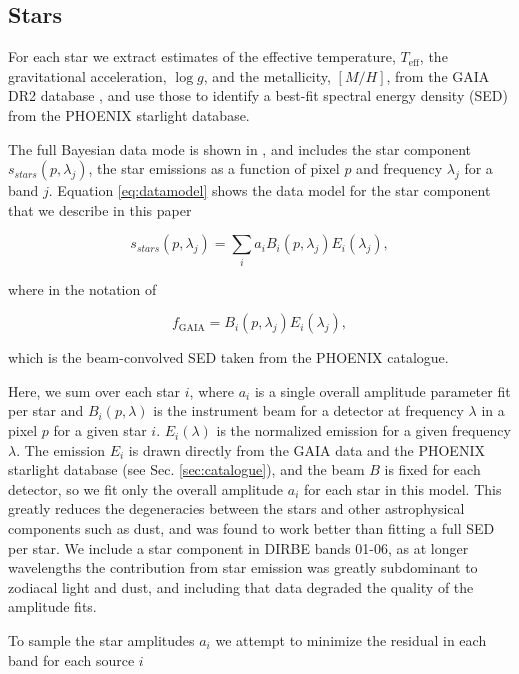 \documentclass{aa}
\begin{document}
\subsection{Stars}

\label{sec:starmodel}

For each star we extract estimates of the effective temperature, $T_{\mathrm{eff}}$, the gravitational acceleration, $\log g$, and the metallicity, $[M/H]$, from the GAIA DR2 database \cite{gaiaCat}, and use those to identify a best-fit spectral energy density (SED) from the PHOENIX starlight database. 

The full Bayesian data mode is shown in \cite{CG02_01}, and includes the star component $s_{stars}(p, \lambda_j)$, the star emissions as a function of pixel $p$ and frequency $\lambda_j$ for a band $j$. Equation \ref{eq:datamodel} shows the data model for the star component that we describe in this paper


\begin{equation}
s_{stars}(p, \lambda_j) = \sum_i a_i B_i(p, \lambda_j) E_i(\lambda_j),
\label{eq:datamodel}
\end{equation}

where in the notation of \cite{CG02_01} 

\begin{equation}
f_{\mathrm{GAIA}} = B_i(p, \lambda_j) E_i(\lambda_j),
\end{equation}

which is the beam-convolved SED taken from the PHOENIX catalogue.

Here, we sum over each star $i$, where $a_i$ is a single overall amplitude parameter fit per star and $B_i(p, \lambda)$ is the instrument beam for a detector at frequency $\lambda$ in a pixel $p$ for a given star $i$. $E_i(\lambda)$ is the normalized emission for a given frequency $\lambda$. The emission $E_i$ is drawn directly from the GAIA data and the PHOENIX starlight database (see Sec. \ref{sec:catalogue}), and the beam $B$ is fixed for each detector, so we fit only the overall amplitude $a_i$ for each star in this model. This greatly reduces the degeneracies between the stars and other astrophysical components such as dust, and was found to work better than fitting a full SED per star. We include a star component in DIRBE bands 01-06, as at longer wavelengths the contribution from star emission was greatly subdominant to zodiacal light and dust, and including that data degraded the quality of the amplitude fits. 

To sample the star amplitudes $a_i$ we attempt to minimize the residual in each band for each source $i$
\end{document}
